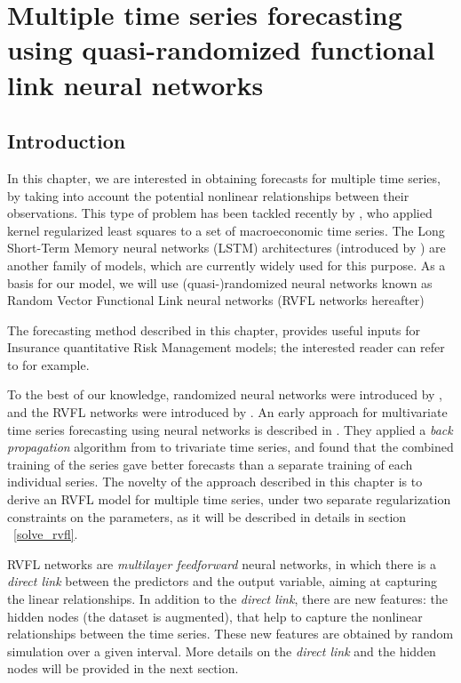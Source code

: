 %
\chapter{Multiple time series forecasting using quasi-randomized functional link neural networks}
\label{sec:rvfl_mts}

\section{Introduction}

In this chapter, we are interested in obtaining forecasts for multiple time series, by taking into account the potential nonlinear relationships between their observations. This type of problem has been tackled recently by \cite{exterkate2016nonlinear}, who applied kernel regularized least squares to a set of macroeconomic time series. The Long Short-Term Memory neural networks (LSTM) architectures (introduced by \cite{hochreiter1997long}) are another family of models, which are currently widely used for this purpose. As a basis for our model, we will use (quasi-)randomized neural networks known as Random Vector Functional Link neural networks (RVFL networks hereafter)

\medskip

The forecasting method described in this chapter, provides useful inputs for Insurance quantitative Risk Management models; the interested reader can refer to \cite{bonnin2015retraite} for example.

\medskip

To the best of our knowledge, randomized neural networks were introduced by \cite{schmidt1992feedforward}, and the RVFL networks were introduced by \cite{pao1994learning}. An early approach for multivariate time series forecasting using neural networks is described in \cite{chakraborty1992forecasting}. They applied a \textit{back propagation} algorithm from \cite{rumelhart1988learning} to trivariate time series, and found that the combined training of the series gave better forecasts than a separate training of each individual series. The novelty of the approach described in this chapter is to derive an RVFL model for multiple time series, under two separate regularization constraints on the parameters, as it will be described in details in  section ~\ref{solve_rvfl}.

\medskip

RVFL networks are \textit{multilayer feedforward} neural networks, in which there is a \textit{direct link} between the predictors and the output variable, aiming at capturing the linear relationships. In addition to the \textit{direct link}, there are new features: the hidden nodes (the dataset is augmented), that help to capture the nonlinear relationships between the time series. These new features are obtained by random simulation over a given interval. More details on the \textit{direct link} and the hidden nodes will be provided in the next section.

